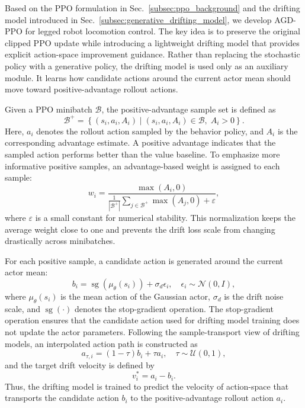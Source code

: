 \documentclass[conference]{IEEEtran}
\begin{document}
Based on the PPO formulation in Sec.~\ref{subsec:ppo_background} and the drifting model introduced in Sec.~\ref{subsec:generative_drifting_model}, we develop AGD-PPO for legged robot locomotion control. The key idea is to preserve the original clipped PPO update while introducing a lightweight drifting model that provides explicit action-space improvement guidance. Rather than replacing the stochastic policy with a generative policy, the drifting model is used only as an auxiliary module. It learns how candidate actions around the current actor mean should move toward positive-advantage rollout actions.

Given a PPO minibatch $\mathcal{B}$, the positive-advantage sample set is defined as
\begin{equation}
\label{eq:agdp_positive_set}
    \mathcal{B}^{+}
    =
    \left\{
    (s_i,a_i,A_i)
    \mid
    (s_i,a_i,A_i)\in\mathcal{B},\; A_i>0
    \right\}.
\end{equation}
Here, $a_i$ denotes the rollout action sampled by the behavior policy, and $A_i$ is the corresponding advantage estimate. A positive advantage indicates that the sampled action performs better than the value baseline. To emphasize more informative positive samples, an advantage-based weight is assigned to each sample:
\begin{equation}
\label{eq:agdp_adv_weight}
    w_i
    =
    \frac{
    \max(A_i,0)
    }{
    \frac{1}{|\mathcal{B}^{+}|}
    \sum_{j\in\mathcal{B}^{+}}\max(A_j,0)
    +
    \varepsilon
    },
\end{equation}
where $\varepsilon$ is a small constant for numerical stability. This normalization keeps the average weight close to one and prevents the drift loss scale from changing drastically across minibatches.

For each positive sample, a candidate action is generated around the current actor mean:
\begin{equation}
\label{eq:agdp_candidate_action}
    b_i
    =
    \operatorname{sg}
    \left(
    \mu_{\theta}(s_i)
    \right)
    +
    \sigma_d \epsilon_i,
    \quad
    \epsilon_i\sim\mathcal{N}(0,I),
\end{equation}
where $\mu_{\theta}(s_i)$ is the mean action of the Gaussian actor, $\sigma_d$ is the drift noise scale, and $\operatorname{sg}(\cdot)$ denotes the stop-gradient operation. The stop-gradient operation ensures that the candidate action used for drifting model training does not update the actor parameters. Following the sample-transport view of drifting models, an interpolated action path is constructed as
\begin{equation}
\label{eq:agdp_drift_path}
    a_{\tau,i}
    =
    (1-\tau)b_i+\tau a_i,
    \quad
    \tau\sim\mathcal{U}(0,1),
\end{equation}
and the target drift velocity is defined by
\begin{equation}
\label{eq:agdp_target_velocity}
    v_i^{*}
    =
    a_i-b_i.
\end{equation}
Thus, the drifting model is trained to predict the velocity of action-space that transports the candidate action $b_i$ to the positive-advantage rollout action $a_i$.
\end{document}
